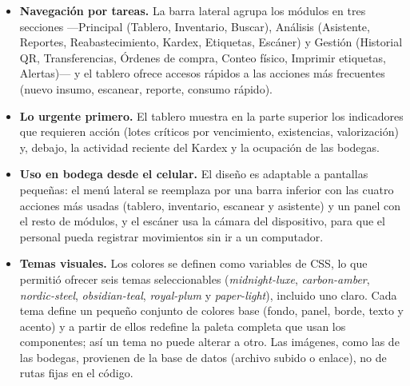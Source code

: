 \begin{itemize}
    \item \textbf{Navegación por tareas.} La barra lateral agrupa los módulos en tres secciones ---Principal (Tablero, Inventario, Buscar), Análisis (Asistente, Reportes, Reabastecimiento, Kardex, Etiquetas, Escáner) y Gestión (Historial QR, Transferencias, Órdenes de compra, Conteo físico, Imprimir etiquetas, Alertas)--- y el tablero ofrece accesos rápidos a las acciones más frecuentes (nuevo insumo, escanear, reporte, consumo rápido).
    \item \textbf{Lo urgente primero.} El tablero muestra en la parte superior los indicadores que requieren acción (lotes críticos por vencimiento, existencias, valorización) y, debajo, la actividad reciente del Kardex y la ocupación de las bodegas.
    \item \textbf{Uso en bodega desde el celular.} El diseño es adaptable a pantallas pequeñas: el menú lateral se reemplaza por una barra inferior con las cuatro acciones más usadas (tablero, inventario, escanear y asistente) y un panel con el resto de módulos, y el escáner usa la cámara del dispositivo, para que el personal pueda registrar movimientos sin ir a un computador.
    \item \textbf{Temas visuales.} Los colores se definen como variables de CSS, lo que permitió ofrecer seis temas seleccionables (\textit{midnight-luxe}, \textit{carbon-amber}, \textit{nordic-steel}, \textit{obsidian-teal}, \textit{royal-plum} y \textit{paper-light}), incluido uno claro. Cada tema define un pequeño conjunto de colores base (fondo, panel, borde, texto y acento) y a partir de ellos redefine la paleta completa que usan los componentes; así un tema no puede alterar a otro. Las imágenes, como las de las bodegas, provienen de la base de datos (archivo subido o enlace), no de rutas fijas en el código.
\end{itemize}

